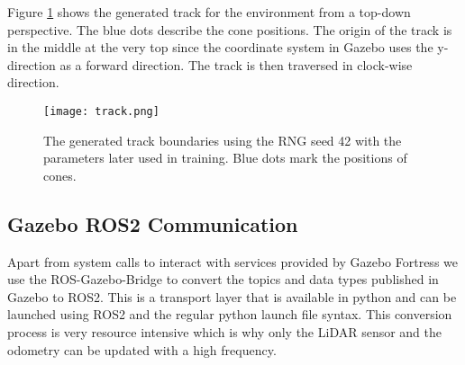 Figure \ref{fig:track} shows the generated track for the environment from a top-down perspective. The blue dots describe the cone positions. The origin of the track is in the middle at the very top since the coordinate system in Gazebo uses the y-direction as a forward direction. The track is then traversed in clock-wise direction.

\begin{figure}[ht]
\vskip 0.2in
\begin{center}
\centerline{\texttt{[image: track.png]}}
\caption{The generated track boundaries using the RNG seed 42 with the parameters later used in training. Blue dots mark the positions of cones.}
\label{fig:track}
\end{center}
\vskip -0.2in
\end{figure}

\subsection{Gazebo ROS2 Communication}

Apart from system calls to interact with services provided by Gazebo Fortress we use the ROS-Gazebo-Bridge to convert the topics and data types published in Gazebo to ROS2. 
This is a transport layer that is available in python and can be launched using ROS2 and the regular python launch file syntax. 
This conversion process is very resource intensive which is why only the LiDAR sensor and the odometry can be updated with a high frequency.

